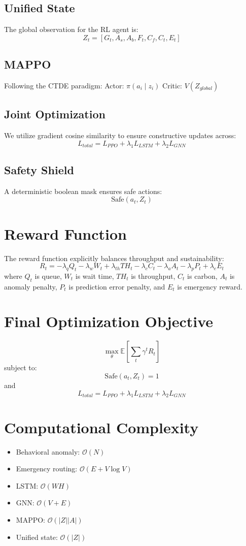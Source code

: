 \documentclass{ieeeaccess}
\begin{document}
\subsection{Unified State}
The global observation for the RL agent is:
$$ Z_t = [G_t, A_s, A_b, F_t, C_f, C_t, E_t] $$

\subsection{MAPPO}
Following the CTDE paradigm:
Actor: $\pi(a_i \mid z_i)$
Critic: $V(Z_{global})$

\subsection{Joint Optimization}
We utilize gradient cosine similarity to ensure constructive updates across:
$$ L_{total} = L_{PPO} + \lambda_1 L_{LSTM} + \lambda_2 L_{GNN} $$

\subsection{Safety Shield}
A deterministic boolean mask ensures safe actions:
$$ \text{Safe}(a_t, Z_t) $$

\section{Reward Function}
\label{sec:reward_function}
The reward function explicitly balances throughput and sustainability:
$$ R_t = -\lambda_q Q_t - \lambda_w W_t + \lambda_{th} TH_t - \lambda_c C_t - \lambda_a A_t - \lambda_p P_t + \lambda_e E_t $$
where $Q_t$ is queue, $W_t$ is wait time, $TH_t$ is throughput, $C_t$ is carbon, $A_t$ is anomaly penalty, $P_t$ is prediction error penalty, and $E_t$ is emergency reward.

\section{Final Optimization Objective}
\label{sec:optimization_objective}
$$ \max_\theta \mathbb{E} \left[ \sum_t \gamma^t R_t \right] $$
subject to:
$$ \text{Safe}(a_t, Z_t) = 1 $$
and
$$ L_{total} = L_{PPO} + \lambda_1 L_{LSTM} + \lambda_2 L_{GNN} $$

\section{Computational Complexity}
\label{sec:complexity}
\begin{itemize}
    \item Behavioral anomaly: $\mathcal{O}(N)$
    \item Emergency routing: $\mathcal{O}(E + V\log V)$
    \item LSTM: $\mathcal{O}(WH)$
    \item GNN: $\mathcal{O}(V + E)$
    \item MAPPO: $\mathcal{O}(|Z||A|)$
    \item Unified state: $\mathcal{O}(|Z|)$
\end{itemize}
\end{document}
